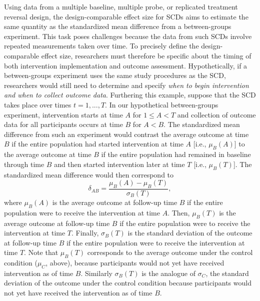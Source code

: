 \documentclass[
]{book}
\begin{document}
Using data from a multiple baseline, multiple probe, or replicated treatment reversal design, the design-comparable effect size for SCDs aims to estimate the same quantity as the standardized mean difference from a between-groups experiment. This task poses challenges because the data from such SCDs involve repeated measurements taken over time. To precisely define the design-comparable effect size, researchers must therefore be specific about the timing of both intervention implementation and outcome assessment. Hypothetically, if a between-groups experiment uses the same study procedures as the SCD, researchers would still need to determine and specify \emph{when to begin intervention and when to collect outcome data}. Furthering this example, suppose that the SCD takes place over times \(t=1,...,T\). In our hypothetical between-groups experiment, intervention starts at time \(A\) for \(1 \leq A < T\) and collection of outcome data for all participants occurs at time \(B\) for \(A < B\).
The standardized mean difference from such an experiment would contrast the average outcome at time \(B\) if the entire population had started intervention at time \(A\) {[}i.e., \(\mu_B(A)\){]} to the average outcome at time \(B\) if the entire population had remained in baseline through time \(B\) and then started intervention later at time \(T\) {[}i.e., \(\mu_B(T)\){]}. The standardized mean difference would then correspond to
\begin{equation}
\label{eq:SMD-SCD}
\delta_{AB} = \frac{\mu_B(A) - \mu_B(T)}{\sigma_B(T)},
\end{equation}
where \(\mu_B(A)\) is the average outcome at follow-up time \(B\) if the entire population were to receive the intervention at time \(A\). Then, \(\mu_B(T)\) is the average outcome at follow-up time \(B\) if the entire population were to receive the intervention at time \(T\). Finally, \(\sigma_B(T)\) is the standard deviation of the outcome at follow-up time \(B\) if the entire population were to receive the intervention at time \(T\).
Note that \(\mu_B(T)\) corresponds to the average outcome under the control condition (\(\mu_C\), above), because participants would not yet have received intervention as of time \(B\). Similarly \(\sigma_B(T)\) is the analogue of \(\sigma_C\), the standard deviation of the outcome under the control condition because participants would not yet have received the intervention as of time \(B\).
\end{document}
